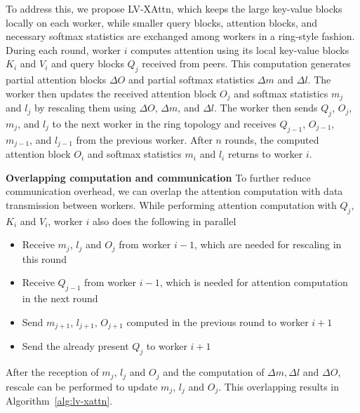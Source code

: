 To address this, we propose LV-XAttn, which keeps the large key-value blocks locally on each worker, while smaller query blocks, attention blocks, and necessary softmax statistics are exchanged among workers in a ring-style fashion. During each round, worker $i$ computes attention using its local key-value blocks $K_i$ and $V_i$ and query blocks $Q_j$ received from peers. This computation generates partial attention blocks $\Delta O$ and partial softmax statistics $\Delta m$ and $\Delta l$. The worker then updates the received attention block $O_j$ and softmax statistics $m_j$ and $l_j$ by rescaling them using $\Delta O$, $\Delta m$, and $\Delta l$. The worker then sends $Q_j$, $O_j$, $m_j$, and $l_j$ to the next worker in the ring topology and receives $Q_{j-1}$, $O_{j-1}$, $m_{j-1}$, and $l_{j-1}$ from the previous worker. After $n$ rounds, the computed attention block $O_i$ and softmax statistics $m_i$ and $l_i$ returns to worker $i$.

\textbf{Overlapping computation and communication} To further reduce communication overhead, we can overlap the attention computation with data transmission between workers. While performing attention computation with $Q_j$, $K_i$ and $V_i$, worker $i$ also does the following in parallel
\begin{itemize}
    \item Receive $m_j$, $l_j$ and $O_j$ from worker $i-1$, which are needed for rescaling in this round
    \item Receive $Q_{j-1}$ from worker $i-1$, which is needed for attention computation in the next round
    \item Send $m_{j+1}$, $l_{j+1}$, $O_{j+1}$ computed in the previous round to worker $i+1$
    \item Send the already present $Q_j$ to worker $i+1$
\end{itemize}
After the reception of $m_j$, $l_j$ and $O_j$ and the computation of $\Delta m, \Delta l$ and $\Delta O$, rescale can be performed to update $m_j$, $l_j$ and $O_j$. This overlapping results in Algorithm~\ref{alg:lv-xattn}.

